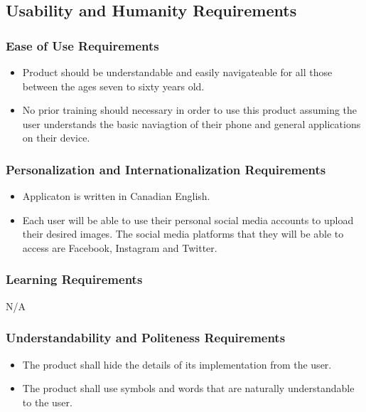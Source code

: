 \documentclass[]{article}
\begin{document}

\subsection{Usability and Humanity Requirements}
\label{sub:usability_and_humanity_requirements}

\subsubsection{Ease of Use Requirements}
\label{ssub:ease_of_use_requirements}
\begin{itemize}
	\item Product should be understandable and easily navigateable for all those between the ages seven to sixty years old.
	\item No prior training should necessary in order to use this product assuming the user understands the basic naviagtion of their phone and general applications on their device.
\end{itemize}

\subsubsection{Personalization and Internationalization Requirements}
\label{ssub:personalization_and_internationalization_requirements}
\begin{itemize}
	\item Applicaton is written in Canadian English.
	\item Each user will be able to use their personal social media accounts to upload their desired images. The social media platforms that they will be able to access are Facebook, Instagram and Twitter.
\end{itemize}

\subsubsection{Learning Requirements}
\label{ssub:learning_requirements}
\begin{itemize}
	N/A
\end{itemize}

\subsubsection{Understandability and Politeness Requirements}
\label{ssub:understandability_and_politeness_requirements}
\begin{itemize}
	\item The product shall hide the details of its implementation from the user.
	\item The product shall use symbols and words that are naturally understandable to the user.
\end{itemize}
\end{document}
